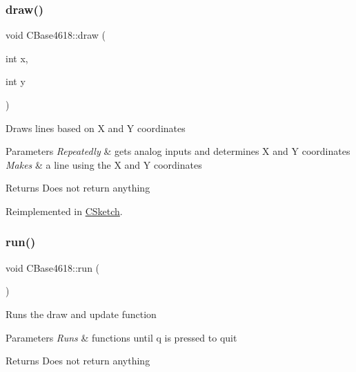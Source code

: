 \subsubsection{\texorpdfstring{draw()}{draw()}}
{\footnotesize\ttfamily void C\+Base4618\+::draw (\begin{DoxyParamCaption}\item[{int}]{x,  }\item[{int}]{y }\end{DoxyParamCaption})\hspace{0.3cm}{\ttfamily [virtual]}}

Draws lines based on X and Y coordinates


\begin{DoxyParams}{Parameters}
{\em Repeatedly} & gets analog inputs and determines X and Y coordinates \\
\hline
{\em Makes} & a line using the X and Y coordinates\\
\hline
\end{DoxyParams}
\begin{DoxyReturn}{Returns}
Does not return anything 
\end{DoxyReturn}


Reimplemented in \hyperlink{class_c_sketch_a9b5af655812ecfa15791f5199854a3a4}{C\+Sketch}.

\hypertarget{class_c_base4618_a535e816d735d10d6048dd39cd893d393}{}\label{class_c_base4618_a535e816d735d10d6048dd39cd893d393} 
\subsubsection{\texorpdfstring{run()}{run()}}
{\footnotesize\ttfamily void C\+Base4618\+::run (\begin{DoxyParamCaption}{ }\end{DoxyParamCaption})}

Runs the draw and update function


\begin{DoxyParams}{Parameters}
{\em Runs} & functions until q is pressed to quit\\
\hline
\end{DoxyParams}
\begin{DoxyReturn}{Returns}
Does not return anything 
\end{DoxyReturn}
\hypertarget{class_c_base4618_a46e2ad109d3c7c877d00cff9093736c7}{}\label{class_c_base4618_a46e2ad109d3c7c877d00cff9093736c7} 
